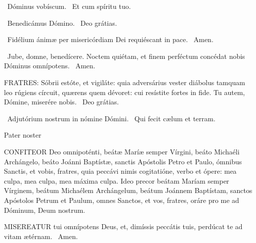 
\V\ Dóminus vobíscum. \R\ Et cum spíritu tuo.

\V\ Benedicámus Dómino. \R\ Deo grátias.

\V\ Fidélium ánimæ per misericórdiam Dei requiéscant in pace. \R\ Amen.




\V\ Jube, domne, benedícere.  Noctem quiétam, et finem perféctum concédat nobis Dóminus omnípotens. \R\ Amen.


\lettrine[lines=2]{F}{RATRES}: Sóbrii estóte, et vigiláte: quia adversárius vester diábolus tamquam leo rúgiens círcuit, quærens quem dévoret: cui resístite fortes in fide. Tu autem, Dómine, miserére nobis. \R\ Deo grátias.

\V\ Adjutórium nostrum in nómine Dómini. \R\ Qui fecit cælum et terram.

Pater noster 


\lettrine[lines=2]{C}{ONFITEOR} Deo omnipoténti, beátæ Maríæ semper Vírgini, beáto Michaéli Archángelo, beáto Joánni Baptístæ, sanctis Apóstolis Petro et Paulo, ómnibus Sanctis, et vobis, fratres, quia peccávi nimis cogitatióne, verbo et ópere: mea culpa, mea culpa, mea máxima culpa. Ideo precor beátam Maríam semper Vírginem, beátum Michaélem Archángelum, beátum Joánnem Baptístam, sanctos Apóstolos Petrum et Paulum, omnes Sanctos, et vos, fratres, oráre pro me ad Dóminum, Deum nostrum.


\lettrine[lines=2]{M}{ISEREATUR} tui omnípotens Deus, et, dimíssis peccátis tuis, perdúcat te ad vitam ætérnam. \R\ Amen.


